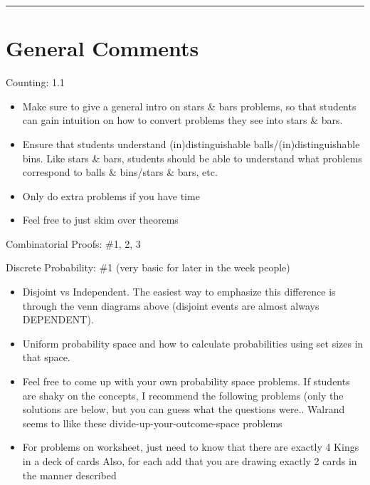 \documentclass{exam}
\title{}
\date{Berlekamp-Welsh, Countability, Self Reference, Counting}
\begin{document}
\maketitle
\rule{\textwidth}{0.15em}
\fontsize{12}{15}\selectfont
\thispagestyle{empty}


\section{General Comments}
\begin{questions}
  \item Counting: 1.1
    \begin{itemize}
      \item Make sure to give a general intro on stars \& bars problems, so that students can gain intuition on how to convert problems they see into stars \& bars. 
      \item Ensure that students understand (in)distinguishable balls/(in)distinguishable bins. Like stars \& bars, students should be able to understand what problems correspond to balls \& bins/stars \& bars, etc.
      \item Only do extra problems if you have time
      \item Feel free to just skim over theorems
    \end{itemize}
  \item Combinatorial Proofs: \#1, 2, 3
  \item Discrete Probability: \#1 (very basic for later in the week people)
    \begin{itemize}
      \item Disjoint vs Independent. The easiest way to emphasize this difference is through the venn diagrams above (disjoint events are almost always DEPENDENT).
      \item Uniform probability space and how to calculate probabilities using set sizes in that space.
      \item Feel free to come up with your own probability space problems. If students are shaky on the concepts, I recommend the following problems (only the solutions are below, but you can guess what the questions were.. Walrand seems to llike these divide-up-your-outcome-space problems
      \item For problems on worksheet, just need to know that there are exactly 4 Kings in a deck of cards
            Also, for each add that you are drawing exactly 2 cards in the manner described

\end{itemize}
\end{questions}
\end{document}
